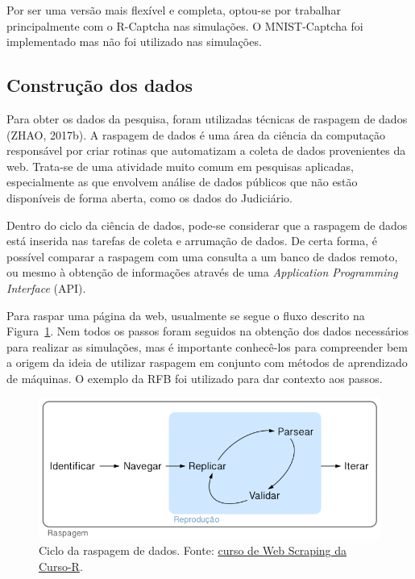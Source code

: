 \documentclass[12pt,twoside,brazilian]{book}
\begin{document}
Por ser uma versão mais flexível e completa, optou-se por trabalhar
principalmente com o R-Captcha nas simulações. O MNIST-Captcha foi
implementado mas não foi utilizado nas simulações.

\hypertarget{construuxe7uxe3o-dos-dados}{%
\subsection{Construção dos dados}\label{construuxe7uxe3o-dos-dados}}

Para obter os dados da pesquisa, foram utilizadas técnicas de raspagem
de dados (ZHAO, 2017b). A raspagem de dados é uma área da ciência da
computação responsável por criar rotinas que automatizam a coleta de
dados provenientes da web. Trata-se de uma atividade muito comum em
pesquisas aplicadas, especialmente as que envolvem análise de dados
públicos que não estão disponíveis de forma aberta, como os dados do
Judiciário.

Dentro do ciclo da ciência de dados, pode-se considerar que a raspagem
de dados está inserida nas tarefas de coleta e arrumação de dados. De
certa forma, é possível comparar a raspagem com uma consulta a um banco
de dados remoto, ou mesmo à obtenção de informações através de uma
\emph{Application Programming Interface} (API).

Para raspar uma página da web, usualmente se segue o fluxo descrito na
Figura~\ref{fig-fluxo-web-scraping}. Nem todos os passos foram seguidos
na obtenção dos dados necessários para realizar as simulações, mas é
importante conhecê-los para compreender bem a origem da ideia de
utilizar raspagem em conjunto com métodos de aprendizado de máquinas. O
exemplo da RFB foi utilizado para dar contexto aos passos.

\begin{figure}

{\centering \includegraphics{./assets/img/cycle.png}

}

\caption{\label{fig-fluxo-web-scraping}Ciclo da raspagem de dados.
Fonte: \href{https://curso-r.github.io/main-web-scraping}{curso de Web
Scraping da Curso-R}.}

\end{figure}
\end{document}
